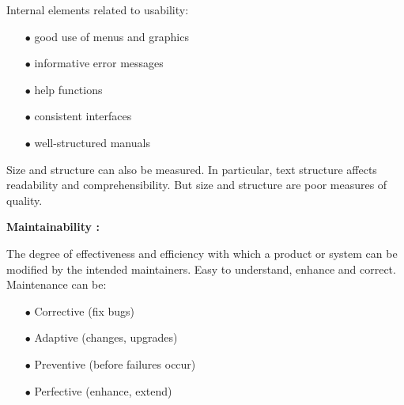 \documentclass{article}
\begin{document}
\noindent Internal elements related to usability:
\begin{itemize}
    \item[$\bullet$] good use of menus and graphics
    \item[$\bullet$] informative error messages
    \item[$\bullet$] help functions
    \item[$\bullet$] consistent interfaces
    \item[$\bullet$] well-structured manuals\\
\end{itemize}

\noindent Size and structure can also be measured. In particular, text structure affects readability and
comprehensibility. But size and structure are poor measures of quality.

\newpage
\begin{center}
    \textbf{Maintainability :}
\end{center}
The degree of effectiveness and efficiency with which a product or system can be
modified by the intended maintainers. Easy to understand, enhance and correct. Maintenance can be:
\begin{itemize}
    \item[$\bullet$]Corrective (fix bugs)
    \item[$\bullet$]Adaptive (changes, upgrades)
    \item[$\bullet$]Preventive (before failures occur)
    \item[$\bullet$]Perfective (enhance, extend)\\
\end{itemize}
\end{document}
